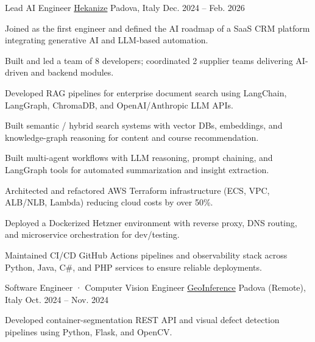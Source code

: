 
\begin{cventries}

  \cventry
    {Lead AI Engineer} %
    {\href{https://www.hekanize.com}{Hekanize}} %
    {Padova, Italy} %
    {Dec. 2024 -- Feb. 2026} %
    {
      \begin{cvitems}
        \item {Joined as the first engineer and defined the AI roadmap of a SaaS CRM platform integrating generative AI and LLM-based automation.}
        \item {Built and led a team of 8 developers; coordinated 2 supplier teams delivering AI-driven and backend modules.}
        \item {Developed RAG pipelines for enterprise document search using LangChain, LangGraph, ChromaDB, and OpenAI/Anthropic LLM APIs.}
        \item {Built semantic / hybrid search systems with vector DBs, embeddings, and knowledge-graph reasoning for content and course recommendation.}
        \item {Built multi-agent workflows with LLM reasoning, prompt chaining, and LangGraph tools for automated summarization and insight extraction.}
        \item {Architected and refactored AWS Terraform infrastructure (ECS, VPC, ALB/NLB, Lambda) reducing cloud costs by over 50\%.}
        \item {Deployed a Dockerized Hetzner environment with reverse proxy, DNS routing, and microservice orchestration for dev/testing.}
        \item {Maintained CI/CD GitHub Actions pipelines and observability stack across Python, Java, C\#, and PHP services to ensure reliable deployments.}
      \end{cvitems}
    }

  \cventry
    {Software Engineer · Computer Vision Engineer} %
    {\href{https://www.geoinference.com/en/homeeng/}{GeoInference}} %
    {Padova (Remote), Italy} %
    {Oct. 2024 -- Nov. 2024} %
    {
      \begin{cvitems}
        \item {Developed container-segmentation REST API and visual defect detection pipelines using Python, Flask, and OpenCV.}
      \end{cvitems}
    }


\end{cventries}
